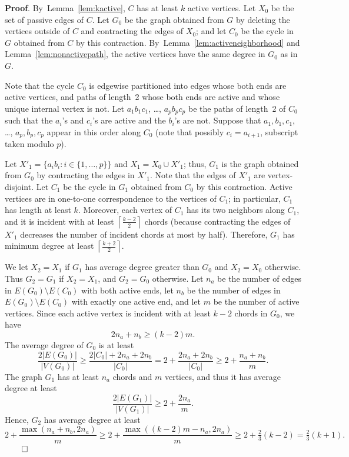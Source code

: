 \documentclass[10pt,a4paper]{amsart}
\newenvironment{proof}{\noindent\textbf{Proof}.}{\hfill$\qed$}
\begin{document}
\begin{proof}
    By~Lemma~\ref{lem:kactive}, $C$ has at least $k$ active vertices. Let $X_0$ be the set of 
    passive edges of $C$.  Let $G_0$ be the graph obtained from $G$ by deleting the vertices outside of $C$
    and contracting the edges of $X_0$; and let $C_0$ be the cycle in $G$ obtained from $C$ by this contraction.
    By~Lemma~\ref{lem:activeneighborhood} and Lemma~\ref{lem:nonactivepath}, the active vertices have the same degree in $G_0$ as in $G$.

    Note that the cycle $C_0$ is edgewise partitioned into edges whose both ends are active vertices, and
    paths of length~2 whose both ends are active and whose unique internal
    vertex is not.  Let $a_1b_1c_1$, \dots, $a_pb_pc_p$ be the paths
    of length~2 of $C_0$ such that the $a_i$'s and $c_i$'s are active and the
    $b_i$'s are not.  Suppose that $a_1, b_1, c_1$, \dots, $a_p, b_p, c_p$
    appear in this order along $C_0$ (note that possibly $c_i=a_{i+1}$,
    subscript taken modulo $p$).

    Let $X'_1=\{a_ib_i:i\in \{1,\ldots,p\}\}$ and $X_1=X_0\cup X'_1$; thus, $G_1$ is the graph obtained from $G_0$ by contracting the edges in $X'_1$.
    Note that the edges of $X'_1$ are vertex-disjoint.   Let $C_1$ be the cycle in $G_1$ obtained from $C_0$ by this contraction.
    Active vertices are in one-to-one correspondence to the vertices of $C_1$; in particular, $C_1$ has length at least $k$.
    Moreover, each vertex of $C_1$ has its two neighbors along $C_1$, and it is incident with at least $\left\lceil \frac{k-2}{2}\right\rceil$
    chords (because contracting the edges of $X'_1$ decreases the number of incident chords
    at most by half).  Therefore, $G_1$ has minimum degree at least $\left\lceil \frac{k+2}{2}\right\rceil$.

    We let $X_2=X_1$ if $G_1$ has average degree greater than $G_0$ and $X_2=X_0$ otherwise.  Thus $G_2 = G_1$ if $X_2=X_1$, and $G_2 = G_0$ otherwise.   Let $n_a$ be the number of edges in $E(G_0)\setminus E(C_0)$
    with both active ends, let $n_b$ be the number of edges in $E(G_0)\setminus E(C_0)$ with exactly one active end, and let $m$ be the number of active vertices.
    Since each active vertex is incident with at least $k-2$ chords in $G_0$,
    we have
    $$2n_a+n_b\ge (k-2)m.$$
    The average degree of $G_0$ is at least
    $$\frac{2|E(G_0)|}{|V(G_0)|}\ge \frac{2|C_0|+2n_a+2n_b}{|C_0|}=2+\frac{2n_a+2n_b}{|C_0|}\ge 2+\frac{n_a+n_b}{m}.$$
    The graph $G_1$ has at least $n_a$ chords and $m$ vertices, and thus it has average degree at least
    $$\frac{2|E(G_1)|}{|V(G_1)|}\ge 2+\frac{2n_a}{m}.$$
    Hence, $G_2$ has average degree at least
    $$2+\frac{\max(n_a+n_b,2n_a)}{m}\ge 2+\frac{\max((k-2)m-n_a,2n_a)}{m}\ge 2+\tfrac{2}{3}(k-2)=\tfrac{2}{3}(k+1).$$
\end{proof}
\end{document}

